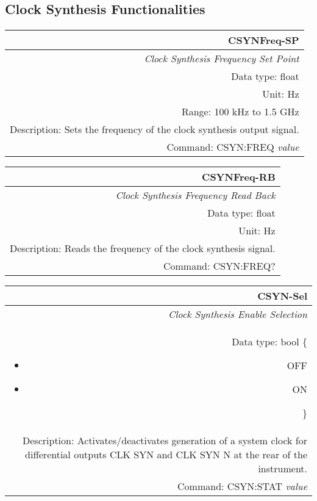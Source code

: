 \documentclass[openany]{article}
\begin{document}
	\subsection{Clock Synthesis Functionalities}\label{pvgroup:function} %

		\paragraph{} %

		\begin{tabular}{N}
			\hline
			\bfseries CSYNFreq-SP \\ \hline
			\emph{Clock Synthesis Frequency Set Point} \\
			Data type: float \\
			Unit: Hz \\
			Range: 100 kHz to 1.5 GHz \\
			Description: Sets the frequency of the clock synthesis output signal. \\
			Command: CSYN:FREQ \emph{value} \\

		\end{tabular}


		\begin{tabular}{N}
			\hline
			\bfseries CSYNFreq-RB \\ \hline
			\emph{Clock Synthesis Frequency Read Back} \\
			Data type: float \\
			Unit: Hz \\
			Description: Reads the frequency of the clock synthesis signal. \\
			Command: CSYN:FREQ? \\

		\end{tabular}
%
		\begin{tabular}{N}
			\hline
			\bfseries CSYN-Sel \\ \hline
			\emph{Clock Synthesis Enable Selection} \\
			Data type: bool \{\begin{itemize}[noitemsep]
				\small
				\item[] OFF
				\item[] ON
			\end{itemize}\} \\
			Description: Activates/deactivates generation of a system clock for differential outputs CLK SYN and CLK SYN N at the rear of the instrument. \\
			Command: CSYN:STAT \emph{value} \\

		\end{tabular}
\end{document}
